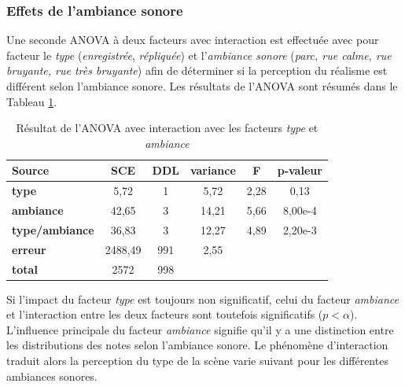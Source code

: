 \subsubsection{Effets de l'ambiance sonore}

Une seconde ANOVA à deux facteurs avec interaction est effectuée avec pour facteur le \textit{type} (\textit{enregistrée}, \textit{répliquée}) et l'\textit{ambiance sonore} (\textit{parc, rue calme, rue bruyante, rue très bruyante}) afin de déterminer si la perception du réalisme est différent selon l'ambiance sonore. Les résultats de l'ANOVA sont résumés dans le Tableau \ref{tab:anova_ambiance}.

\begin{table}[ht]
\centering
\begin{tabular}{lccccc}
\hline
\textbf{Source}     & \textbf{SCE} & \textbf{DDL} & \textbf{variance} & \textbf{F} & \textbf{p-valeur} \\
\hline
\textbf{type} & 5,72 & 1 & 5,72 & 2,28 & 0,13 \\
\hline
\textbf{ambiance} & 42,65 & 3 & 14,21 & 5,66 & 8,00e-4 \\
\hline
\textbf{type/ambiance} & 36,83 & 3 & 12,27 & 4,89 & 2,20e-3 \\
\hline
\textbf{erreur}      & 2488,49 & 991 & 2,55 & &  \\
\hline
\textbf{total}      & 2572 & 998 & & & \\
\hline
\end{tabular}
\caption{Résultat de l'ANOVA avec interaction avec les facteurs \textit{type} et \textit{ambiance}}
\label{tab:anova_ambiance}
\end{table}


Si l'impact du facteur \textit{type} est toujours non significatif, celui du facteur \textit{ambiance} et l'interaction entre les deux facteurs sont toutefois significatifs ($p < \alpha$). L'influence principale du facteur \textit{ambiance} signifie qu'il y a une distinction entre les distributions des notes selon l'ambiance sonore. Le phénomène d'interaction traduit alors la perception du type de la scène varie suivant pour les différentes ambiances sonores.

